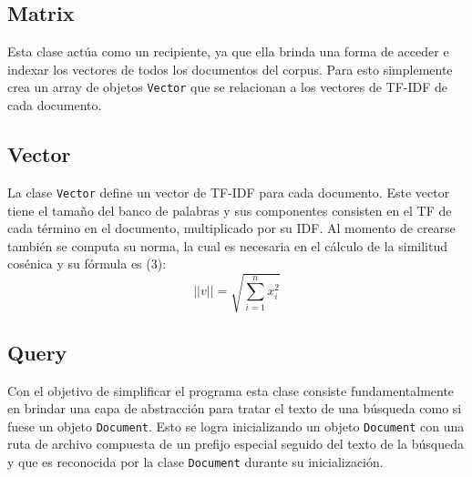 \documentclass[a4paper,12pt]{article}
\begin{document}
\subsection{Matrix}
    Esta clase actúa como un recipiente, ya que ella brinda una forma de acceder e indexar los
vectores de todos los documentos del corpus. Para esto simplemente crea un array de objetos \texttt{Vector}
que se relacionan a los vectores de TF-IDF de cada documento.

\subsection{Vector}
    La clase \texttt{Vector} define un vector de TF-IDF para cada documento. Este vector tiene el tamaño del
banco de palabras y sus componentes consisten en el TF de cada término en el documento, multiplicado por su IDF.
Al momento de crearse también se computa su norma, la cual es necesaria en el cálculo de la similitud
cosénica y su fórmula es (3):
\begin{equation}
    ||v|| = \sqrt{\sum_{i=1}^{n} x_i^2}
\end{equation}


\subsection{Query}
    Con el objetivo de simplificar el programa esta clase consiste fundamentalmente
en brindar una capa de abstracción para tratar el texto de una búsqueda como si fuese
un objeto \texttt{Document}. Esto se logra inicializando un objeto \texttt{Document} con
una ruta de archivo compuesta de un prefijo especial seguido del texto de la búsqueda y que es
reconocida por la clase \texttt{Document} durante su inicialización.

\newpage
\tableofcontents
\end{document}
